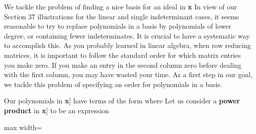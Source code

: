 \documentclass[11pt,oneside]{article}
\begin{document}
\fi
\renewcommand{\BookFooter}{Section 38 Gröbner Bases for Ideals}
\ifdefined\BookMaster\else\setcounter{page}{303}\fi
\BookNarrativetrue

\begin{BookBody}


\noindent We tackle the problem of finding a nice basis for an ideal  in \BookInline{F[}\textbf{x}\BookInline{]\; = F[x_{1},\allowbreak x_{2},\allowbreak \cdots,\allowbreak x_{n}].} In view of our Section 37 illustrations for the linear and single indeterminant cases, it seems reasonable to try to replace polynomials in a basis by polynomials of lower degree, or containing fewer indeterminates. It is crucial to have a systematic way to accomplish this. As you probably learned in linear algebra, when row reducing matrices, it is important to follow the standard order for which matrix entries you make zero. If you make an entry in the second column zero before dealing with the first column, you may have wasted your time. As a first step in our goal, we tackle this problem of specifying an order for polynomials in a basis.


\noindent Our polynomials in \BookInline{F[}\textbf{x}] have terms of the form  where  Let us consider a\textbf{ power product} in \BookInline{F[}\textbf{x}] to be an expression

\begin{center}\begin{adjustbox}{max width=\linewidth}\end{adjustbox}\end{center}


\end{BookBody}
\end{document}
